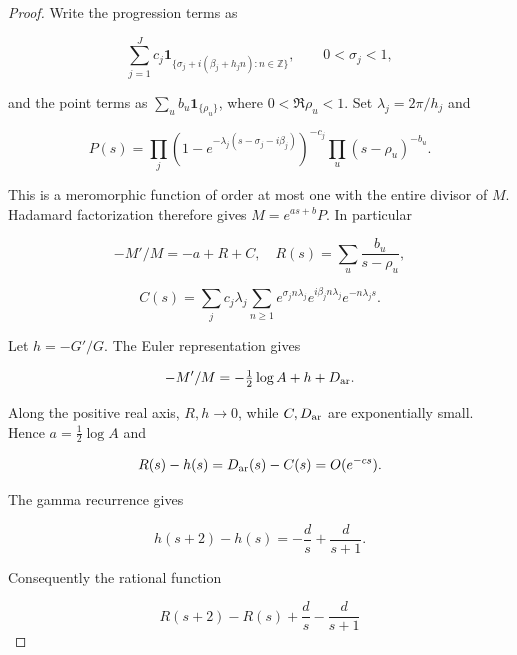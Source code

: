 \begin{proof} Write the progression terms as

\begin{equation}\label{eq:ob4-1}
\sum_{j=1}^J c_j\mathbf1_{
\{\sigma_j+i(\beta_j+h_jn):n\in\mathbb Z\}},
\qquad 0<\sigma_j<1,
\end{equation}

and the point terms as \(\sum_u b_u\mathbf1_{\{\rho_u\}}\), where \(0<\Re\rho_u<1\). Set \(\lambda_j=2\pi/h_j\) and

\begin{equation}\label{eq:ob4-2}
P(s)=\prod_j
(1-e^{-\lambda_j(s-\sigma_j-i\beta_j)})^{-c_j}
\prod_u(s-\rho_u)^{-b_u}.
\end{equation}

This is a meromorphic function of order at most one with the entire divisor of \(M\). Hadamard factorization therefore gives \(M=e^{as+b}P\). In particular

\begin{equation}\label{eq:ob4-3}
-M'/M=-a+R+C,
\quad R(s)=\sum_u\frac{b_u}{s-\rho_u},
\end{equation}

\begin{equation}\label{eq:ob4-4}
C(s)=\sum_j c_j\lambda_j\sum_{n\ge1}
e^{\sigma_j n\lambda_j}e^{i\beta_j n\lambda_j}
e^{-n\lambda_js}.
\end{equation}

Let \(h=-G'/G\). The Euler representation gives

\begin{equation}\label{eq:ob4-5}
-M'/M=-\tfrac12\log A+h+D_{\rm ar}.
\end{equation}

Along the positive real axis, \(R,h\to0\), while \(C,D_{\rm ar}\) are exponentially small. Hence \(a=\tfrac12\log A\) and

\begin{equation}\label{eq:ob4-6}
R(s)-h(s)=D_{\rm ar}(s)-C(s)=O(e^{-cs}).
\end{equation}

The gamma recurrence gives

\begin{equation}\label{eq:ob4-7}
h(s+2)-h(s)=-\frac d s+\frac d{s+1}.
\end{equation}

Consequently the rational function

\begin{equation}\label{eq:ob4-8}
R(s+2)-R(s)+\frac d s-\frac d{s+1}
\end{equation}


\end{proof}
